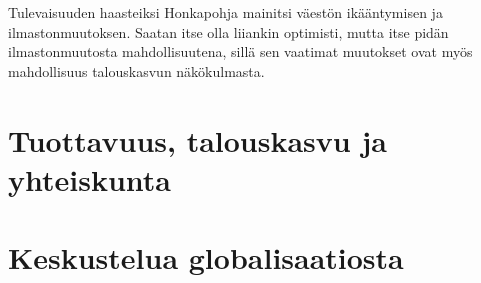 \documentclass[12pt]{article}
\begin{document}
Tulevaisuuden haasteiksi Honkapohja mainitsi väestön ikääntymisen ja ilmastonmuutoksen. Saatan itse olla liiankin optimisti, mutta itse pidän ilmastonmuutosta mahdollisuutena, sillä sen vaatimat muutokset ovat myös mahdollisuus talouskasvun näkökulmasta.


\newpage
\section{Tuottavuus, talouskasvu ja yhteiskunta}


\newpage
\section{Keskustelua globalisaatiosta}
\end{document}
